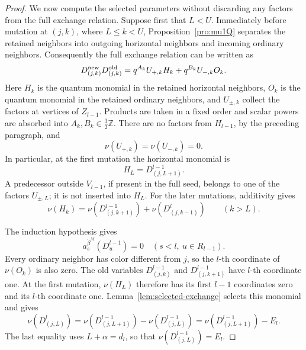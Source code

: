 \documentclass[12pt, reqno]{amsart}
\theoremstyle{plain}
\theoremstyle{definition}
\numberwithin{equation}{section}
\begin{document}
\begin{proof}
We now compute the selected parameters without discarding any
factors from the full exchange relation. Suppose first that \(L<U\).
Immediately before mutation at \((j,k)\), where \(L\leq k<U\),
Proposition~\ref{pro:mu1Q} separates the retained neighbors into
outgoing horizontal neighbors and incoming ordinary neighbors.
Consequently the full exchange relation can be written as
\begin{equation}\label{eq:induction-exchange-general}
 D^{\rm new}_{(j,k)}D^{\rm old}_{(j,k)}
 =q^{A_k}U_{+,k}H_k+q^{B_k}U_{-,k}O_k.
\end{equation}
Here \(H_k\) is the quantum monomial in the retained horizontal
neighbors, \(O_k\) is the quantum monomial in the retained ordinary
neighbors, and \(U_{\pm,k}\) collect the factors at vertices of
\(Z_{l-1}\). Products are taken in a fixed order and scalar powers
are absorbed into \(A_k,B_k\in\tfrac12\mathbb Z\). There are no
factors from \(H_{l-1}\), by the preceding paragraph, and
\[
 \nu(U_{+,k})=\nu(U_{-,k})=0.
\]
In particular, at the first mutation the horizontal monomial is
\begin{equation}\label{eq:induction-exchange-first}
 H_L=D^{l-1}_{(j,L+1)}.
\end{equation}
A predecessor outside \(V_{l-1}\), if present in the full seed, belongs
to one of the factors \(U_{\pm,L}\); it is not inserted into
\(H_L\). For the later mutations, additivity gives
\[
 \nu(H_k)=
 \nu(D^{l-1}_{(j,k+1)})+\nu(D^l_{(j,k-1)})
 \qquad(k>L).
\]

The induction hypothesis gives
\begin{equation}\label{eq:Dl-1=0}
 a_s^{\dot\beta^M}(D^{l-1}_u)=0
 \quad(s<l,\ u\in R_{l-1}).
\end{equation}
Every ordinary neighbor has color different from \(j\), so the
\(l\)-th coordinate of \(\nu(O_k)\) is also zero. The old variables
\(D^{l-1}_{(j,k)}\) and \(D^{l-1}_{(j,k+1)}\) have \(l\)-th
coordinate one. At the first mutation, \(\nu(H_L)\) therefore has
its first \(l-1\) coordinates zero and its \(l\)-th coordinate one.
Lemma~\ref{lem:selected-exchange} selects this monomial and gives
\begin{equation}\label{eq:induction-recurrence}
 \nu(D^l_{(j,L)})
 =\nu(D^{l-1}_{(j,L+1)})-\nu(D^{l-1}_{(j,L)})
 =\nu(D^{l-1}_{(j,L+1)})-E_l.
\end{equation}
The last equality uses \(L+\alpha=d_l\), so that
\(\nu(D^{l-1}_{(j,L)})=E_l\).


\end{proof}
\end{document}
